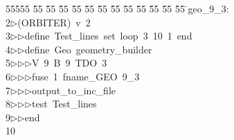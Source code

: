 %
%
\begin{tabbing}
55555 \= 55 \= 55 \= 55 \= 55 \= 55 \= 55 \= 55 \= 55 \= 55 \= 55 \= 55 \= 55 \= \>geo\_9\_3:\\[0pt]
2\>$\triangleright$\>(ORBITER)\ v\ 2\ \\[0pt]
3\>$\triangleright$\>$\triangleright$\>define\ Test\_lines\ set\ loop\ 3\ 10\ 1\ end\ \\[0pt]
4\>$\triangleright$\>$\triangleright$\>define\ Geo\ geometry\_builder\ \\[0pt]
5\>$\triangleright$\>$\triangleright$\>$\triangleright$\>V\ 9\ B\ 9\ TDO\ 3\ \\[0pt]
6\>$\triangleright$\>$\triangleright$\>$\triangleright$\>fuse\ 1\ fname\_GEO\ 9\_3\ \\[0pt]
7\>$\triangleright$\>$\triangleright$\>$\triangleright$\>output\_to\_inc\_file\ \\[0pt]
8\>$\triangleright$\>$\triangleright$\>$\triangleright$\>test\ Test\_lines\ \\[0pt]
9\>$\triangleright$\>$\triangleright$\>end\\[0pt]
10\>\end{tabbing}
